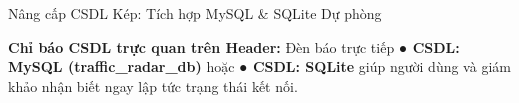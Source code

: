 \documentclass[aspectratio=169, 11pt]{beamer}
\begin{document}
\begin{frame}{Nâng cấp CSDL Kép: Tích hợp MySQL \& SQLite Dự phòng}
  \vspace{0.10cm}
  \centering
  \begin{tcolorbox}[
    enhanced, colback=DarkMain, colframe=white, boxrule=1.0pt, arc=3.5pt,
    top=3.5pt, bottom=3.5pt, left=8pt, right=8pt
  ]
    {\fontsize{7.4pt}{9.2pt}\selectfont\color{white}\textbf{Chỉ báo CSDL trực quan trên Header:} Đèn báo trực tiếp \textbf{● CSDL: MySQL (traffic\_radar\_db)} hoặc \textbf{● CSDL: SQLite} giúp người dùng và giám khảo nhận biết ngay lập tức trạng thái kết nối.}
  \end{tcolorbox}
\end{frame}

\end{document}
